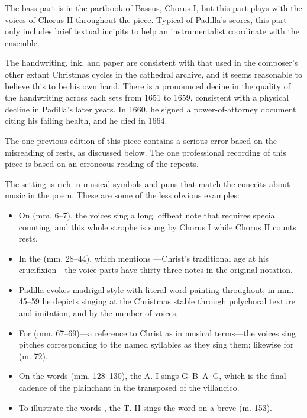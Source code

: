 The bass part is in the partbook of Bassus, Chorus I, but this part plays with 
the voices of Chorus II throughout the piece.
Typical of Padilla's scores, this part only includes brief textual
incipits to help an instrumentalist coordinate with the ensemble.

The handwriting, ink, and paper are consistent with that used in the composer's
other extant Christmas cycles in the cathedral archive, and it seems reasonable
to believe this to be his own hand.
There is a pronounced decine in the quality of the handwriting across each sets
from 1651 to 1659, consistent with a physical decline in Padilla's later
years.
In 1660, he signed a power-of-attorney document citing his failing 
health\autocite{Mauleon:PadillaCivil}, and he died in 1664.

The one previous edition of this piece contains a serious error based on the 
misreading of rests, as discussed below.%
    \Autocite{Padilla:Tello}
The one professional recording of this piece is based on an erroneous reading of
the repeats.%
  \autocite{Padilla:HabanaCD}

The setting is rich in musical symbols and puns that match the conceits about
music in the poem.%
    \Autocite[167--178]{Cashner:PhD}
These are some of the less obvious examples:
\begin{itemize}
    \item On  (mm. 6--7), the voices sing a long, offbeat note that
        requires special counting, and this whole strophe is sung by Chorus I
        while Chorus II counts rests.
    \item In the  (mm. 28--44), which mentions ---Christ's traditional age at his crucifixion---the voice
        parts have thirty-three notes in the original notation.
    \item Padilla evokes madrigal style with literal word painting throughout; 
        in mm. 45--59 he depicts singing at the Christmas stable  through polychoral texture and imitation, and
         by the number of voices.
    \item For  (mm. 67--69)---a
        reference to Christ as  in musical
        terms---the voices sing pitches corresponding to the named syllables as
        they sing them; likewise for  (m. 72).
    \item On the words  (mm. 128--130), the A. I sings
        G--B\fl--A--G, which is the final cadence of the plainchant  in the transposed  of the villancico.
    \item To illustrate the words , the
        T. II sings the word  on a breve (m. 153).
\end{itemize}


